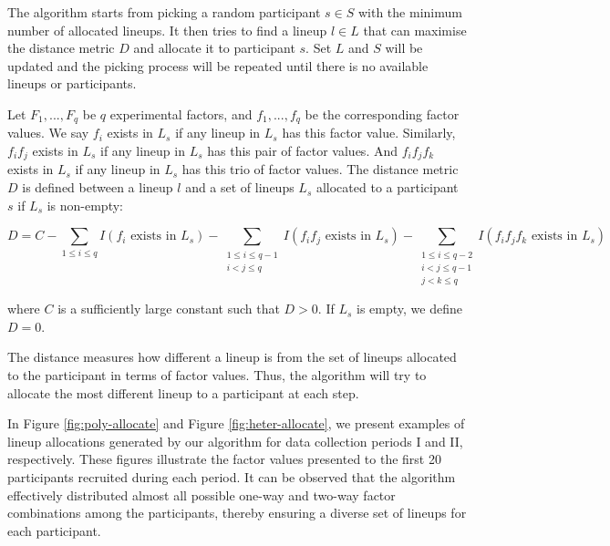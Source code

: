 \documentclass[]{interact}
\theoremstyle{plain}%
\theoremstyle{definition}
\theoremstyle{remark}
\begin{document}
The algorithm starts from picking a random participant \(s \in S\) with
the minimum number of allocated lineups. It then tries to find a lineup
\(l \in L\) that can maximise the distance metric \(D\) and allocate it
to participant \(s\). Set \(L\) and \(S\) will be updated and the
picking process will be repeated until there is no available lineups or
participants.

Let \(F_1,...,F_q\) be \(q\) experimental factors, and \(f_1, ...,f_q\)
be the corresponding factor values. We say \(f_i\) exists in \(L_{s}\)
if any lineup in \(L_{s}\) has this factor value. Similarly, \(f_if_j\)
exists in \(L_{s}\) if any lineup in \(L_{s}\) has this pair of factor
values. And \(f_if_jf_k\) exists in \(L_{s}\) if any lineup in \(L_{s}\)
has this trio of factor values. The distance metric \(D\) is defined
between a lineup \(l\) and a set of lineups \(L_{s}\) allocated to a
participant \(s\) if \(L_{s}\) is non-empty:

\footnotesize

\begin{equation*}
D =
C - \sum_{1\leq i \leq q}I(f_i\text{ exists in }L_{s}) - \sum_{\substack{1\leq i \leq q-1 \\ i < j \leq q}}I(f_if_j\text{ exists in }L_{s}) - \sum_{\substack{1\leq i \leq q - 2 \\ i < j \leq q - 1 \\ j < k \leq q}}I(f_if_jf_k\text{ exists in }L_{s})
\end{equation*}

\normalsize

where \(C\) is a sufficiently large constant such that \(D > 0\). If
\(L_{s}\) is empty, we define \(D = 0\).

The distance measures how different a lineup is from the set of lineups
allocated to the participant in terms of factor values. Thus, the
algorithm will try to allocate the most different lineup to a
participant at each step.

In Figure \ref{fig:poly-allocate} and Figure \ref{fig:heter-allocate},
we present examples of lineup allocations generated by our algorithm for
data collection periods I and II, respectively. These figures illustrate
the factor values presented to the first 20 participants recruited
during each period. It can be observed that the algorithm effectively
distributed almost all possible one-way and two-way factor combinations
among the participants, thereby ensuring a diverse set of lineups for
each participant.
\end{document}
